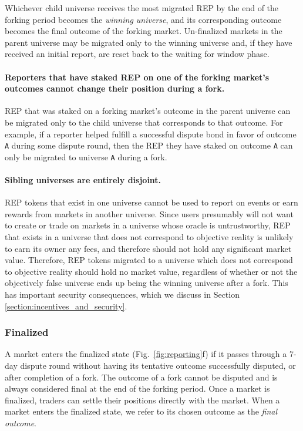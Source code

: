 \documentclass[floatfix,reprint,nofootinbib,amsmath,amssymb,epsfig,pre,floats,letterpaper,groupedaffiliation]{revtex4-1}
\theoremstyle{definition}
\theoremstyle{definition}
\begin{document}
Whichever child universe receives the most migrated REP by the end of the forking period becomes the \textit{winning universe}, and its corresponding outcome becomes the final outcome of the forking market.  Un-finalized markets in the parent universe may be migrated only to the winning universe and, if they have received an initial report, are reset back to the waiting for window phase.

\paragraph*{Reporters that have staked REP on one of the forking market's outcomes cannot change their position during a fork.}  REP that was staked on a forking market's outcome in the parent universe can be migrated only to the child universe that corresponds to that outcome. For example, if a reporter helped fulfill a successful dispute bond in favor of outcome \texttt{A} during some dispute round, then the REP they have staked on outcome \texttt{A} can only be migrated to universe \texttt{A} during a fork.

\paragraph*{Sibling universes are entirely disjoint.}  REP tokens that exist in one universe cannot be used to report on events or earn rewards from markets in another universe.  Since users presumably will not want to create or trade on markets in a universe whose oracle is untrustworthy, REP that exists in a universe that does not correspond to objective reality is unlikely to earn its owner any fees, and therefore should not hold any significant market value.  Therefore, REP tokens migrated to a universe which does not correspond to objective reality should hold no market value, regardless of whether or not the objectively false universe ends up being the winning universe after a fork.  This has important security consequences, which we discuss in Section \ref{section:incentives_and_security}.

\subsubsection{Finalized}

A market enters the finalized state (Fig.~\ref{fig:reporting}f) if it passes through a 7-day dispute round without having its tentative outcome successfully disputed, or after completion of a fork.  The outcome of a fork cannot be disputed and is always considered final at the end of the forking period.  Once a market is finalized, traders can settle their positions directly with the market.  When a market enters the finalized state, we refer to its chosen outcome as the \textit{final outcome}.
\end{document}
